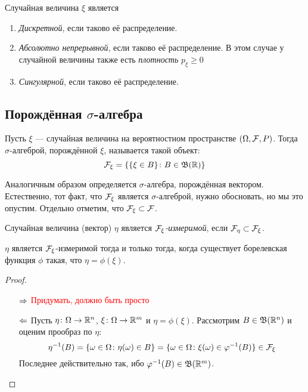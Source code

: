 Случайная величина $\xi$ является
\begin{enumerate}
	\item \textit{Дискретной}, если таково её распределение.
	
	\item \textit{Абсолютно непрерывной}, если таково её распределение. В этом случае у случайной величины также есть \textit{плотность} $p_\xi \ge 0$
	
	\item \textit{Сингулярной}, если таково её распределение.
\end{enumerate}

\subsection{Порождённая $\sigma$-алгебра}

\begin{definition}
	Пусть $\xi$ --- случайная величина на вероятностном пространстве $(\Omega, \mathcal{F}, P)$. Тогда $\sigma$-алгеброй, порождённой $\xi$, называется такой объект:
	\[
		\mathcal{F}_\xi = \{\{\xi \in B\} \colon B \in \mathfrak{B}(\mathbb{R})\}
	\]
\end{definition}

\begin{note}
	Аналогичным образом определяется $\sigma$-алгебра, порождённая вектором. Естественно, тот факт, что $\mathcal{F}_\xi$ является $\sigma$-алгеброй, нужно обосновать, но мы это опустим. Отдельно отметим, что $\mathcal{F}_\xi \subset \mathcal{F}$.
\end{note}

\begin{definition}
	Случайная величина (вектор) $\eta$ является \textit{$\mathcal{F}_\xi$-измеримой}, если $\mathcal{F}_\eta \subset \mathcal{F}_\xi$.
\end{definition}

\begin{lemma}
	$\eta$ является $\mathcal{F}_\xi$-измеримой тогда и только тогда, когда существует борелевская функция $\phi$ такая, что $\eta = \phi(\xi)$.
\end{lemma}

\begin{proof}~
	\begin{itemize}
		\item[$\Rightarrow$] \textcolor{red}{Придумать, должно быть просто}
		
		\item [$\Leftarrow$] Пусть $\eta \colon \Omega \to \mathbb{R}^n$, $\xi \colon \Omega \to \mathbb{R}^m$ и $\eta = \phi(\xi)$. Рассмотрим $B \in \mathfrak{B}(\mathbb{R}^n)$ и оценим прообраз по $\eta$:
		\[
			\eta^{-1}(B) = \{\omega \in \Omega \colon \eta(\omega) \in B\} = \{\omega \in \Omega \colon \xi(\omega) \in \varphi^{-1}(B)\} \in \mathcal{F}_\xi
		\]
		Последнее действительно так, ибо $\varphi^{-1}(B) \in \mathfrak{B}(\mathbb{R}^m)$.
	\end{itemize}
\end{proof}


